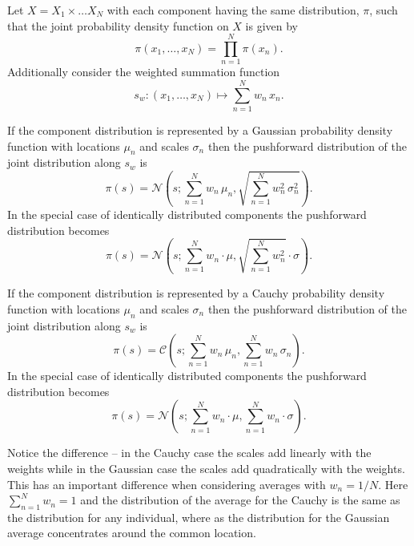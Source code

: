 \documentclass[11pt, oneside]{article}
\begin{document}
Let $X = X_{1} \times \ldots X_{N}$ with each
component having the same distribution, $\pi$,
such that the joint probability density function 
on $X$ is given by 
%
\begin{equation*}
\pi(x_{1}, \ldots, x_{N})
=
\prod_{n = 1}^{N} \pi(x_{n}).
\end{equation*}
%
Additionally consider the weighted summation 
function
%
\begin{equation*}
s_{w} : (x_{1}, \ldots, x_{N}) \mapsto \sum_{n = 1}^{N} w_{n} \, x_{n}.
\end{equation*}

If the component distribution is represented by
a Gaussian probability density function with locations
$\mu_{n}$ and scales $\sigma_{n}$ then the pushforward 
distribution of the joint distribution along $s_{w}$ 
is 
%
\begin{equation*}
\pi(s) = \mathcal{N} \left( s ; 
\sum_{n = 1}^{N} w_{n} \, \mu_{n}, 
\sqrt{ \sum_{n = 1}^{N} w^{2}_{n} \, \sigma^{2}_{n}} \right).
\end{equation*}
%
In the special case of identically distributed
components the pushforward distribution becomes
%
\begin{equation*}
\pi(s) = \mathcal{N} \left( s ; 
\sum_{n = 1}^{N} w_{n} \cdot \mu, 
\sqrt{ \sum_{n = 1}^{N} w^{2}_{n} } \cdot \sigma \right).
\end{equation*}


If the component distribution is represented by
a Cauchy probability density function with locations
$\mu_{n}$ and scales $\sigma_{n}$ then the pushforward 
distribution of the joint distribution along $s_{w}$ 
is 
%
\begin{equation*}
\pi(s) = \mathcal{C} \left( s ; 
\sum_{n = 1}^{N} w_{n} \, \mu_{n}, 
\sum_{n = 1}^{N} w_{n} \, \sigma_{n} \right).
\end{equation*}
%
In the special case of identically distributed
components the pushforward distribution becomes
%
\begin{equation*}
\pi(s) = \mathcal{N} \left( s ; 
\sum_{n = 1}^{N} w_{n} \cdot \mu, 
\sum_{n = 1}^{N} w_{n} \cdot \sigma \right).
\end{equation*}

Notice the difference -- in the Cauchy case the 
scales add linearly with the weights while in the
Gaussian case the scales add quadratically with
the weights.  This has an important difference 
when considering averages with $w_{n} = 1 / N$.
Here $\sum_{n = 1}^{N} w_{n} = 1$ and the
distribution of the average for the Cauchy is
the same as the distribution for any individual,
where as the distribution for the Gaussian average
concentrates around the common location. 
\end{document}
